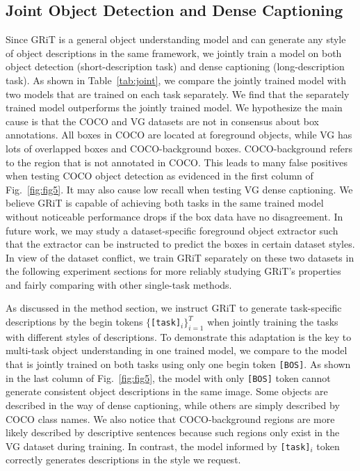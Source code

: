 \documentclass[10pt,twocolumn,letterpaper]{article}
\begin{document}
\subsection{Joint Object Detection and Dense Captioning}
Since GRiT is a general object understanding model and can generate any style of object descriptions in the same framework, we jointly train a model on both object detection (short-description task) and dense captioning (long-description task). As shown in Table~\ref{tab:joint}, we compare the jointly trained model with two models that are trained on each task separately. We find that the separately trained model outperforms the jointly trained model. We hypothesize the main cause is that the COCO and VG datasets are not in consensus about box annotations. All boxes in COCO are located at foreground objects, while VG has lots of overlapped boxes and COCO-background boxes. COCO-background refers to the region that is not annotated in COCO. This leads to many false positives when testing COCO object detection as evidenced in the first column of Fig.~\ref{fig:fig5}. It may also cause low recall when testing VG dense captioning. We believe GRiT is capable of achieving both tasks in the same trained model without noticeable performance drops if the box data have no disagreement. In future work, we may study a dataset-specific foreground object extractor such that the extractor can be instructed to predict the boxes in certain dataset styles. In view of the dataset conflict, we train GRiT separately on these two datasets in the following experiment sections for more reliably studying GRiT's properties and fairly comparing with other single-task methods. 

As discussed in the method section, we instruct GRiT to generate task-specific descriptions by the begin tokens $\{$\texttt{[task]}$_i\}_{i=1}^{T}$ when jointly training the tasks with different styles of descriptions. To demonstrate this adaptation is the key to multi-task object understanding in one trained model, we compare to the model that is jointly trained on both tasks using only one begin token \texttt{[BOS]}. As shown in the last column of Fig.~\ref{fig:fig5}, the model with only \texttt{[BOS]} token cannot generate consistent object descriptions in the same image. Some objects are described in the way of dense captioning, while others are simply described by COCO class names. We also notice that COCO-background regions are more likely described by descriptive sentences because such regions only exist in the VG dataset during training. In contrast, the model informed by \texttt{[task]}$_i$ token correctly generates descriptions in the style we request.
\end{document}
